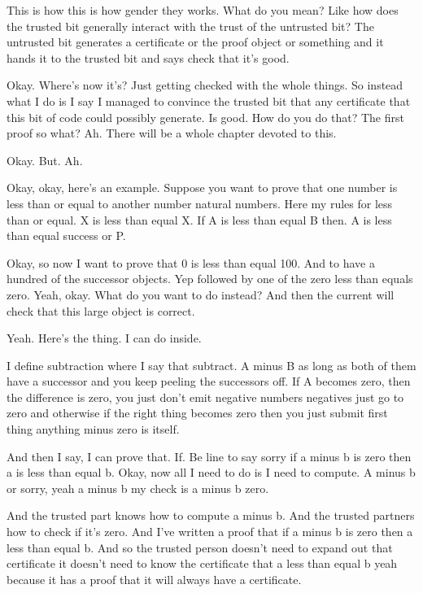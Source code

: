 \begin{subappendices}
    This is how this is how gender they works. What do you mean? Like how does the trusted bit generally interact with the trust of the untrusted bit? The untrusted bit generates a certificate or the proof object or something and it hands it to the trusted bit and says check that it's good. 
    
    Okay. Where's now it's? Just getting checked with the whole things. So instead what I do is I say I managed to convince the trusted bit that any certificate that this bit of code could possibly generate. Is good. How do you do that? The first proof so what? Ah. There will be a whole chapter devoted to this. 
    
    Okay. But. Ah. 
    
    Okay, okay, here's an example. Suppose you want to prove that one number is less than or equal to another number natural numbers. Here my rules for less than or equal. X is less than equal X. If A is less than equal B then. A is less than equal success or P. 
    
    Okay, so now I want to prove that 0 is less than equal 100. And to have a hundred of the successor objects. Yep followed by one of the zero less than equals zero. Yeah, okay. What do you want to do instead? And then the current will check that this large object is correct. 
    
    Yeah. Here's the thing. I can do inside. 
    
    I define subtraction where I say that subtract. A minus B as long as both of them have a successor and you keep peeling the successors off. If A becomes zero, then the difference is zero, you just don't emit negative numbers negatives just go to zero and otherwise if the right thing becomes zero then you just submit first thing anything minus zero is itself. 
    
    And then I say, I can prove that. If. Be line to say sorry if a minus b is zero then a is less than equal b. Okay, now all I need to do is I need to compute. A minus b or sorry, yeah a minus b my check is a minus b zero. 
    
    And the trusted part knows how to compute a minus b. And the trusted partners how to check if it's zero. And I've written a proof that if a minus b is zero then a less than equal b. And so the trusted person doesn't need to expand out that certificate it doesn't need to know the certificate that a less than equal b yeah because it has a proof that it will always have a certificate. 
    

\end{subappendices}
